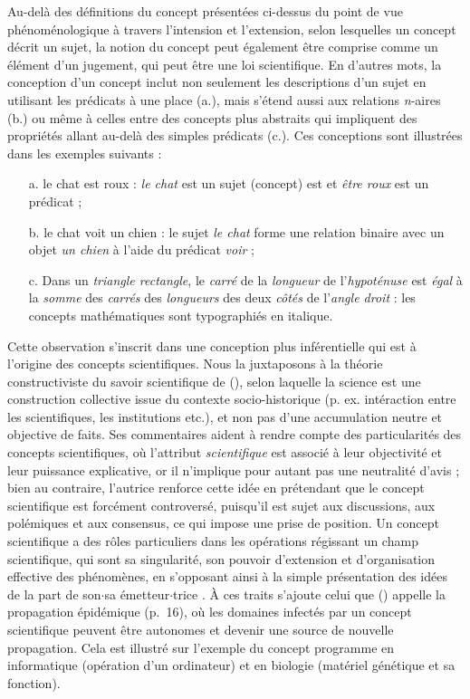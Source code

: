 \begin{description}
Au-delà des définitions du concept présentées ci-dessus du point de vue phénoménologique à travers l'intension et l'extension, selon lesquelles un concept décrit un sujet, la notion du concept peut également être comprise comme un élément d'un jugement, qui peut être une loi scientifique. En d'autres mots, la conception d'un concept inclut non seulement les descriptions d'un sujet en utilisant les prédicats à une place (a.), mais s'étend aussi aux relations \textit{n}-aires (b.) ou même à celles entre des concepts plus abstraits qui impliquent des propriétés allant au-delà des simples prédicats (c.). Ces conceptions sont illustrées dans les exemples suivants :
\begin{itemize}
\item[a.] \og{}le chat est roux\fg{} : \textit{le chat} est un sujet (concept) est et \textit{être roux} est un prédicat ;
\item[b.] \og{}le chat voit un chien\fg{} : le sujet \textit{le chat} forme une relation binaire avec un objet \textit{un chien} à l'aide du prédicat \textit{voir} ;
\item[c.] \og{}Dans un \textit{triangle rectangle}, le \textit{carré} de la \textit{longueur} de l'\textit{hypoténuse} est \textit{égal} à la \textit{somme} des \textit{carrés} des \textit{longueurs} des deux \textit{côtés} de l'\textit{angle droit}\fg{} : les concepts mathématiques sont typographiés en italique.
\end{itemize}
\medskip
Cette observation s'inscrit dans une conception plus \og{}inférentielle\fg{} qui est à l'origine des concepts scientifiques. Nous la juxtaposons à la théorie constructiviste du savoir scientifique de \citeauthor{stengers1987d} (\citeyear{stengers1987d}), selon laquelle la science est une \og{}construction\fg{} collective issue du contexte socio-historique (p. ex. intéraction entre les scientifiques, les institutions etc.), et non pas d'une accumulation neutre et objective de faits. Ses commentaires aident à rendre compte des particularités des concepts scientifiques, où l'attribut \textit{scientifique} est associé à leur objectivité et leur puissance explicative, or il n'implique pour autant pas une neutralité d'avis ; bien au contraire, l'autrice renforce cette idée en prétendant que le concept scientifique est forcément controversé, puisqu'il est sujet aux discussions, aux polémiques et aux consensus, ce qui impose une prise de position. Un concept scientifique a des rôles particuliers dans les opérations régissant un champ scientifique, qui sont sa singularité, son pouvoir d'extension et d'organisation effective des phénomènes, en s'opposant ainsi à la simple présentation des idées de la part de son$\cdot$sa émetteur$\cdot$trice \citep[pp.~10-11]{stengers1987d}. À ces traits s'ajoute celui que \citeauthor{stengers1987d} (\citeyear{stengers1987d}) appelle \og{}la propagation épidémique\fg{} (p.~16), où les domaines \og{}infectés\fg{} par un concept scientifique peuvent être autonomes et devenir une source de nouvelle propagation. Cela est illustré sur l'exemple du concept \og programme \fg{} en informatique (opération d'un ordinateur) et en biologie (matériel génétique et sa fonction).
 
\end{description}


